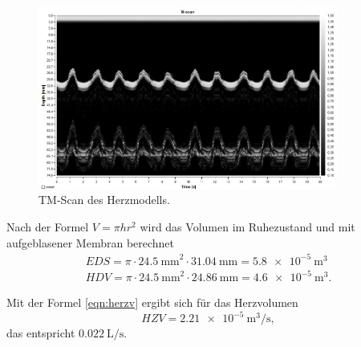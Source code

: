 \begin{figure}[H]
  \centering
  \includegraphics[height=6cm]{Herz.jpg}
  \caption{TM-Scan des Herzmodells.}
  \label{fig:Herz}
\end{figure}

Nach der Formel $V=\pi h r^{2}$ wird das Volumen im Ruhezustand und mit
aufgeblasener Membran berechnet
\begin{align*}
  EDS= \pi\cdot\SI{24,5}{\mm}^{2}\cdot\SI{31,04}{\mm}=\SI{5,8e-5}{\m^{3}}\\
  HDV= \pi\cdot\SI{24,5}{\mm}^{2}\cdot\SI{24,86}{\mm}=\SI{4,6e-5}{\m^{3}}.
\end{align*}

Mit der Formel \ref{eqn:herzv}
ergibt sich für das Herzvolumen
\begin{equation}
  HZV=\SI{2,21e-5}{\m^{3}\per\s},
\end{equation}
das entspricht $\SI{0,022}{\liter\per\s}$.
